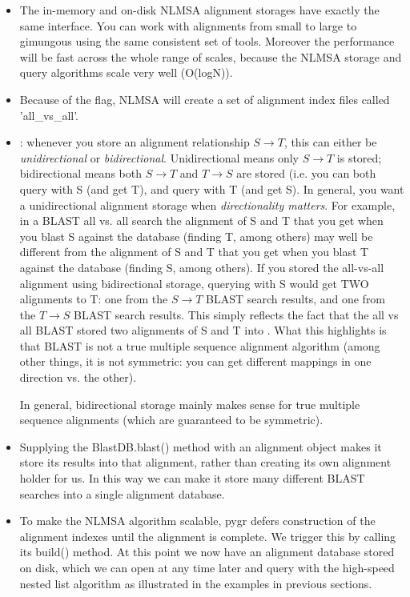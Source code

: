 \documentclass{howto}
\begin{document}
\begin{itemize}

\item
The in-memory and on-disk NLMSA alignment storages have exactly the same
interface.  You can work with alignments from small to large to gimungous
using the same consistent set of tools.  Moreover the performance will be
fast across the whole range of scales, because the NLMSA storage and query
algorithms scale very well (O(logN)).

\item
Because of the  flag, NLMSA will create a set of alignment
index files called 'all_vs_all'.

\item 
{}: whenever you store an alignment relationship
$S \rightarrow T$, this can either be {\em unidirectional} or {\em bidirectional}.
Unidirectional means only $S \rightarrow T$ is stored; bidirectional means
both $S \rightarrow T$ and $T \rightarrow S$ are stored (i.e. you can both query
with S (and get T), and query with T (and get S).  In general, you want 
a unidirectional alignment storage when {\em directionality matters}.  For
example, in a BLAST all vs. all search the alignment of S and T that you get
when you blast S against the database (finding T, among others) may well be
different from the alignment of S and T that you get when you blast T against
the database (finding S, among others).  If you stored the all-vs-all alignment
using bidirectional storage, querying  with S would get TWO alignments 
to T: one from the $S \rightarrow T$ BLAST search results, and one from the
$T \rightarrow S$ BLAST search results.  This simply reflects the fact that 
the all vs all BLAST stored two alignments of S and T into .
What this highlights is that BLAST is not a true multiple sequence alignment
algorithm (among other things, it is not symmetric: you can get different
mappings in one direction vs. the other).  

In general, bidirectional storage
mainly makes sense for true multiple sequence alignments (which are guaranteed
to be symmetric).

\item
Supplying the BlastDB.blast() method with an alignment object makes it store
its results into that alignment, rather than creating its own alignment holder
for us.  In this way we can make it store many different BLAST searches into
a single alignment database.

\item
To make the NLMSA algorithm scalable, pygr defers construction of the alignment
indexes until the alignment is complete.  We trigger this by calling its build()
method.  At this point we now have an alignment database stored on disk, which
we can open at any time later and query with the high-speed nested list algorithm
as illustrated in the examples in previous sections.

\end{itemize}
\end{document}
